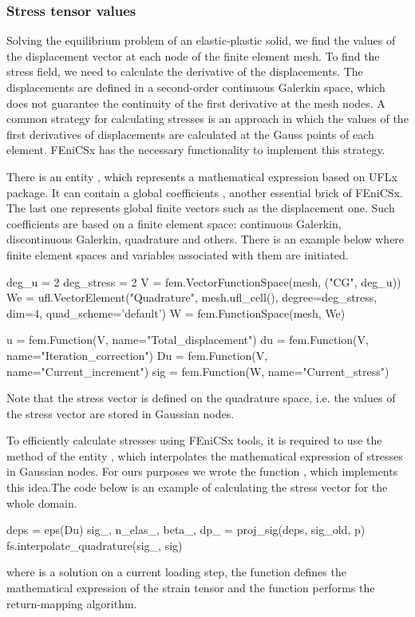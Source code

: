 \documentclass[12pt]{article}
\begin{document}
\subsubsection{Stress tensor values}

Solving the equilibrium problem of an elastic-plastic solid, we find the values of the displacement vector at each node of the finite element mesh. To find the stress field, we need to calculate the derivative of the displacements. The displacements are defined in a second-order continuous Galerkin space, which does not guarantee the continuity of the first derivative at the mesh nodes. A common strategy for calculating stresses is an approach in which the values of the first derivatives of displacements are calculated at the Gauss points of each element. FEniCSx has the necessary functionality to implement this strategy. 

There is an entity , which represents a mathematical expression based on UFLx package. It can contain a global coefficients , another essential brick of FEniCSx. The last one represents global finite vectors such as the displacement one. Such coefficients are based on a finite element space: continuous Galerkin, discontinuous Galerkin, quadrature and others. There is an example below where finite element spaces and variables associated with them are initiated.

\begin{pythoncode}
    deg_u = 2
    deg_stress = 2
    V = fem.VectorFunctionSpace(mesh, ("CG", deg_u))
    We = ufl.VectorElement("Quadrature", mesh.ufl_cell(), degree=deg_stress, dim=4, quad_scheme='default')
    W = fem.FunctionSpace(mesh, We)

    u = fem.Function(V, name="Total_displacement")
    du = fem.Function(V, name="Iteration_correction")
    Du = fem.Function(V, name="Current_increment")
    sig = fem.Function(W, name="Current_stress")
\end{pythoncode}
Note that the stress vector  is defined on the quadrature space, i.e. the values of the stress vector are stored in Gaussian nodes. 

To efficiently calculate stresses using FEniCSx tools, it is required to use the  method of the entity , which interpolates the mathematical expression of stresses in Gaussian nodes. For ours purposes we wrote the function , which implements this idea.The code below is an example of calculating the stress vector for the whole domain.
\begin{pythoncode}
    deps = eps(Du)
    sig_, n_elas_, beta_, dp_ = proj_sig(deps, sig_old, p)
    fs.interpolate_quadrature(sig_, sig)
\end{pythoncode}
where  is a solution on a current loading step, the function  defines the mathematical expression of the strain tensor and the function  performs the return-mapping algorithm.
\end{document}
